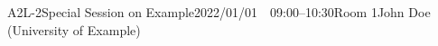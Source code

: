 \begin{session}{A2L-2}{Special Session on Example}{2022/01/01~~09:00--10:30}{Room 1}{John Doe (University of Example)}
\end{session}
